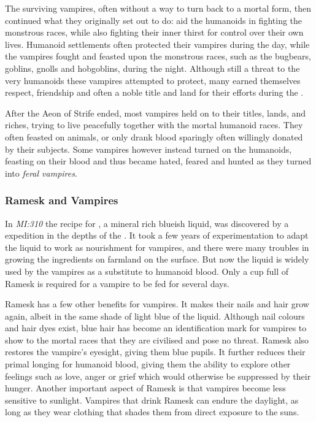The surviving vampires, often without a way to turn back to a mortal form,
then continued what they originally set out to do: aid the humanoids in
fighting the monstrous races, while also fighting their inner thirst for
control over their own lives. Humanoid settlements often protected their
vampires during the day, while the vampires fought and feasted upon the
monstrous races, such as the bugbears, goblins, gnolls and hobgoblins, during
the night. Although still a threat to the very humanoids these vampires
attempted to protect, many earned themselves respect, friendship and often a
noble title and land for their efforts during the .

After the Aeon of Strife ended, most vampires held on to their titles, lands,
and riches, trying to live peacefully together with the mortal humanoid races.
They often feasted on animals, or only drank blood sparingly often willingly
donated by their subjects. Some vampires however instead turned on the
humanoids, feasting on their blood and thus became hated, feared and hunted as
they turned into \emph{feral vampires}.

\subsubsection{Ramesk and Vampires}

In \emph{MI:310} the recipe for , a mineral rich blueish
liquid, was discovered by a  expedition in the depths of
the . It took a few years of experimentation to
adapt the liquid to work as nourishment for vampires, and there were many
troubles in growing the ingredients on farmland on the surface. But now the
liquid is widely used by the vampires as a substitute to humanoid blood. Only
a cup full of Ramesk is required for a vampire to be fed for several days.

Ramesk has a few other benefits for vampires. It makes their nails and hair
grow again, albeit in the same shade of light blue of the liquid. Although
nail colours and hair dyes exist, blue hair has become an identification mark
for vampires to show to the mortal races that they are civilised and pose no
threat. Ramesk also restores the vampire's eyesight, giving them blue
pupils. It further reduces their primal longing for humanoid blood, giving
them the ability to explore other feelings such as love, anger or grief which
would otherwise be suppressed by their hunger. Another important aspect of
Ramesk is that vampires become less sensitive to sunlight. Vampires that drink
Ramesk can endure the daylight, as long as they wear clothing that shades them
from direct exposure to the suns.

